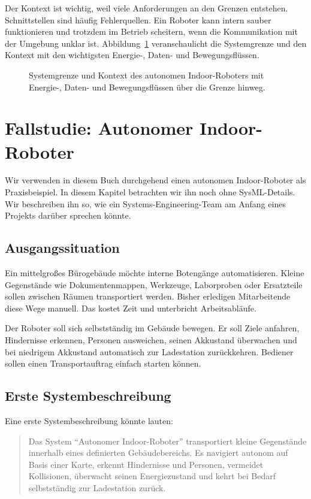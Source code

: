 Der Kontext ist wichtig, weil viele Anforderungen an den Grenzen entstehen. Schnittstellen sind häufig Fehlerquellen. Ein Roboter kann intern sauber funktionieren und trotzdem im Betrieb scheitern, wenn die Kommunikation mit der Umgebung unklar ist. Abbildung~\ref{fig:kap01-systemgrenze} veranschaulicht die Systemgrenze und den Kontext mit den wichtigsten Energie-, Daten- und Bewegungsflüssen.

\begin{figure}[H]
  \centering
  \caption{Systemgrenze und Kontext des autonomen Indoor-Roboters mit Energie-, Daten- und Bewegungsflüssen über die Grenze hinweg.}
  \label{fig:kap01-systemgrenze}
\end{figure}

\section{Fallstudie: Autonomer Indoor-Roboter}
Wir verwenden in diesem Buch durchgehend einen autonomen Indoor-Roboter als Praxisbeispiel. In diesem Kapitel betrachten wir ihn noch ohne SysML-Details. Wir beschreiben ihn so, wie ein Systems-Engineering-Team am Anfang eines Projekts darüber sprechen könnte.

\subsection{Ausgangssituation}
Ein mittelgroßes Bürogebäude möchte interne Botengänge automatisieren. Kleine Gegenstände wie Dokumentenmappen, Werkzeuge, Laborproben oder Ersatzteile sollen zwischen Räumen transportiert werden. Bisher erledigen Mitarbeitende diese Wege manuell. Das kostet Zeit und unterbricht Arbeitsabläufe.

Der Roboter soll sich selbstständig im Gebäude bewegen. Er soll Ziele anfahren, Hindernisse erkennen, Personen ausweichen, seinen Akkustand überwachen und bei niedrigem Akkustand automatisch zur Ladestation zurückkehren. Bediener sollen einen Transportauftrag einfach starten können.

\subsection{Erste Systembeschreibung}
Eine erste Systembeschreibung könnte lauten:

\begin{quote}
Das System \enquote{Autonomer Indoor-Roboter} transportiert kleine Gegenstände innerhalb eines definierten Gebäudebereichs. Es navigiert autonom auf Basis einer Karte, erkennt Hindernisse und Personen, vermeidet Kollisionen, überwacht seinen Energiezustand und kehrt bei Bedarf selbstständig zur Ladestation zurück.
\end{quote}

